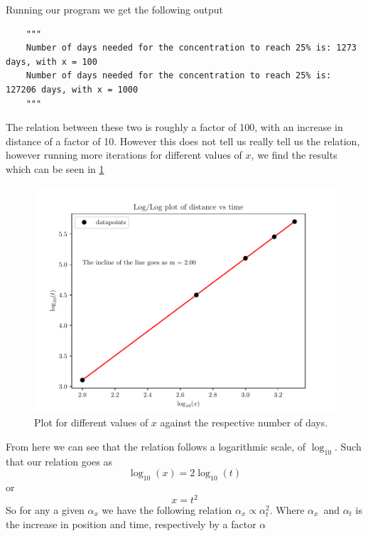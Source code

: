 \documentclass[10pt, a4paper]{amsart}
\begin{document}
Running our program we get the following output
\begin{lstlisting}
	"""
	Number of days needed for the concentration to reach 25% is: 1273 days, with x = 100
	Number of days needed for the concentration to reach 25% is: 127206 days, with x = 1000
	"""
\end{lstlisting}
The relation between these two is roughly a factor of 100, with an increase in distance of a factor of 10. However this does not tell us really tell us the relation, however running more iterations for different values of $x$, we find the results which can be seen in \ref{fig:rel}
\begin{figure}[]
	\centering
	\includegraphics[width=0.9\linewidth]{"../code/Relation.pdf"}
	\caption{Plot for different values of $x$ against the respective number of days.}
	\label{fig:rel}
\end{figure}
From here we can see that the relation follows a logarithmic scale, of $\log_{10}$. Such that our relation goes as 
\begin{equation}
	\log_{10}(x) = 2\log_{10}(t)
\end{equation}
or 
\begin{equation}
	x = t^2
\end{equation}
So for any a given $\alpha_x$ we have the following relation $\alpha_x \propto \alpha_t^2$. Where $\alpha_x$ and $\alpha_t$ is the increase in position and time, respectively by a factor $\alpha$
\end{document}
